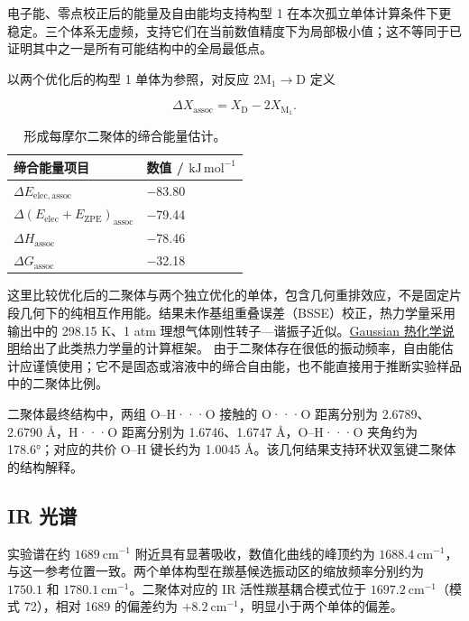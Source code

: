 \documentclass[a4paper,12pt]{article}
\begin{document}
电子能、零点校正后的能量及自由能均支持构型 1 在本次孤立单体计算条件下更稳定。三个体系无虚频，支持它们在当前数值精度下为局部极小值；这不等同于已证明其中之一是所有可能结构中的全局最低点。

以两个优化后的构型 1 单体为参照，对反应 $2\mathrm M_1\rightarrow\mathrm D$ 定义

\[
\Delta X_{\mathrm{assoc}}=X_{\mathrm D}-2X_{\mathrm M_1}.
\]

\begin{table}[htbp]
\centering
\caption{形成每摩尔二聚体的缔合能量估计。}\label{tab:3a}
\begingroup\footnotesize\setlength{\tabcolsep}{4pt}
\begin{tabularx}{\textwidth}{YY}
\toprule
缔合能量项目 & 数值 / $\mathrm{kJ\,mol^{-1}}$ \\
\midrule
$\Delta E_{\mathrm{elec,assoc}}$ & \ensuremath{-}83.80 \\
$\Delta(E_{\mathrm{elec}}+E_{\mathrm{ZPE}})_{\mathrm{assoc}}$ & \ensuremath{-}79.44 \\
$\Delta H_{\mathrm{assoc}}$ & \ensuremath{-}78.46 \\
$\Delta G_{\mathrm{assoc}}$ & \ensuremath{-}32.18 \\
\bottomrule
\end{tabularx}
\endgroup
\end{table}
这里比较优化后的二聚体与两个独立优化的单体，包含几何重排效应，不是固定片段几何下的纯相互作用能。结果未作基组重叠误差（BSSE）校正，热力学量采用输出中的 298.15 K、1 atm 理想气体刚性转子—谐振子近似。\href{https://gaussian.com/wp-content/uploads/dl/thermo.pdf}{Gaussian 热化学说明}给出了此类热力学量的计算框架。\cite{ref6} 由于二聚体存在很低的振动频率，自由能估计应谨慎使用；它不是固态或溶液中的缔合自由能，也不能直接用于推断实验样品中的二聚体比例。

二聚体最终结构中，两组 O–H···O 接触的 O···O 距离分别为 2.6789、2.6790 Å，H···O 距离分别为 1.6746、1.6747 Å，O–H···O 夹角约为 178.6°；对应的共价 O–H 键长约为 1.0045 Å。该几何结果支持环状双氢键二聚体的结构解释。

\subsection{IR 光谱}



实验谱在约 $1689\ \mathrm{cm^{-1}}$ 附近具有显著吸收，数值化曲线的峰顶约为 $1688.4\ \mathrm{cm^{-1}}$，与这一参考位置一致。两个单体构型在羰基候选振动区的缩放频率分别约为 $1750.1$ 和 $1780.1\ \mathrm{cm^{-1}}$。二聚体对应的 IR 活性羰基耦合模式位于 $1697.2\ \mathrm{cm^{-1}}$（模式 72），相对 1689 的偏差约为 $+8.2\ \mathrm{cm^{-1}}$，明显小于两个单体的偏差。
\end{document}
